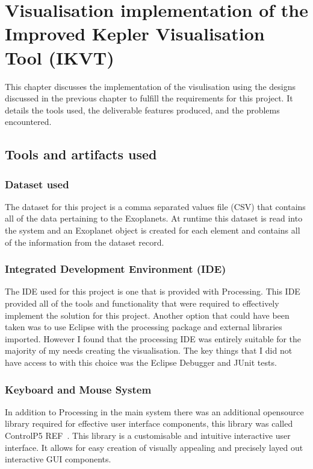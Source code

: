 \chapter{Visualisation implementation of the Improved Kepler Visualisation Tool
(IKVT)}\label{C:sd}
This chapter discusses the implementation of the visulisation using the designs
discussed in the previous chapter to fulfill the requirements for this project.
It details the tools used, the deliverable features
produced, and the problems encountered. 

\section{Tools and artifacts used}
\subsection{Dataset used}
The dataset for this project is a comma separated values file (CSV) that
contains all of the data pertaining to the Exoplanets. At runtime this dataset
is read into the system and an Exoplanet object is created for each element and
contains all of the information from the dataset record.

\subsection{Integrated Development Environment (IDE)}
The IDE used for this project is one that is provided with Processing. This IDE
provided all of the tools and functionality that were required to effectively
implement the solution for this project. Another option that could have been
taken was to use Eclipse with the processing package and external libraries
imported. However I found that the processing IDE was entirely suitable for the
majority of my needs creating the visualisation. The key things that I did not
have access to with this choice was the Eclipse Debugger and JUnit tests. ~   
\subsection{Keyboard and Mouse System}
In addition to Processing in the main system there was an additional opensource
library required for effective user interface components, this library was
called ControlP5 REF~. This library is a customisable and intuitive interactive
user interface. It allows for easy creation of visually appealing and precisely
layed out interactive GUI components.

